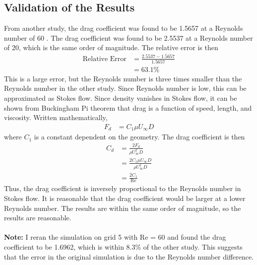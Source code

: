 \subsection{Validation of the Results}
From another study, the drag coefficient was found to be 1.5657 at a Reynolds number of 60 \cite{paper}. The drag coefficient was found to be 2.5537 at a Reynolds number of 20, which is the same order of magnitude. The relative error is then
\begin{align*}
    \text{Relative Error} &= \frac{2.5537 - 1.5657}{1.5657} \\
    &= \boxed{63.1\%}
\end{align*}
This is a large error, but the Reynolds number is three times smaller than the Reynolds number in the other study. Since Reynolds number is low, this can be approximated as Stokes flow. Since density vanishes in Stokes flow, it can be shown from Buckingham Pi theorem that drag is a function of speed, length, and viscosity. Written mathematically, 
\begin{align*}
    F_d &= C_1\mu U_\infty D
\end{align*}
where $C_1$ is a constant dependent on the geometry. The drag coefficient is then
\begin{align*}
    C_d &= \frac{2F_d}{\rho U_\infty^2 D} \\
    &= \frac{2 C_1 \mu U_\infty D}{\rho U_\infty^2 D} \\
    &= \boxed{\frac{2 C_1}{\text{Re}}}
\end{align*}
Thus, the drag coefficient is inversely proportional to the Reynolds number in Stokes flow. It is reasonable that the drag coefficient would be larger at a lower Reynolds number. The results are within the same order of magnitude, so the results are reasonable.
\\\\
\noindent \textbf{Note:} I reran the simulation on grid 5 with Re = 60 and found the drag coefficient to be 1.6962, which is within 8.3\% of the other study. This suggests that the error in the original simulation is due to the Reynolds number difference.